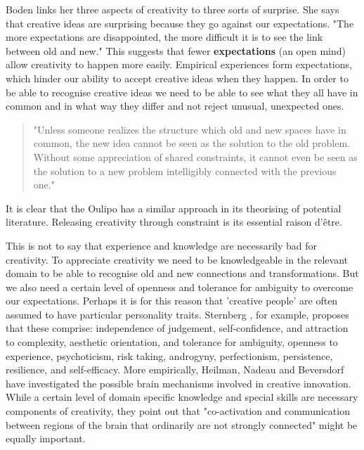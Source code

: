 Boden links her three aspects of creativity to three sorts of surprise. She says that creative ideas are surprising because they go against our expectations. "The more expectations are disappointed, the more difficult it is to see the link between old and new." \citep[p.84]{Boden2003} This suggests that fewer \textbf{expectations} (an open mind) allow creativity to happen more easily. Empirical experiences form expectations, which hinder our ability to accept creative ideas when they happen. In order to be able to recognise creative ideas we need to be able to see what they all have in common and in what way they differ and not reject unusual, unexpected ones.

\begin{quote}
  "Unless someone realizes the structure which old and new spaces have in common, the new idea cannot be seen as the solution to the old problem. Without some appreciation of shared constraints, it cannot even be seen as the solution to a new problem intelligibly connected with the previous one." \citep[p.84]{Boden2003}
\end{quote}

It is clear that the Oulipo has a similar approach in its theorising of potential literature. Releasing creativity through constraint is its essential raison d'être.

This is not to say that experience and knowledge are necessarily bad for creativity. To appreciate creativity we need to be knowledgeable in the relevant domain to be able to recognise old and new connections and transformations. But we also need a certain level of openness and tolerance for ambiguity to overcome our expectations. Perhaps it is for this reason that 'creative people' are often assumed to have particular personality traits. Sternberg \citep{Sternberg1999, Sternberg1999}, for example, proposes that these comprise: independence of judgement, self-confidence, and attraction to complexity, aesthetic orientation, and tolerance for ambiguity, openness to experience, psychoticism, risk taking, androgyny, perfectionism, persistence, resilience, and self-efficacy. More empirically, Heilman, Nadeau and Beversdorf \citep{Heilman2003} have investigated the possible brain mechanisms involved in creative innovation. While a certain level of domain specific knowledge and special skills are necessary components of creativity, they point out that "co-activation and communication between regions of the brain that ordinarily are not strongly connected" might be equally important.

